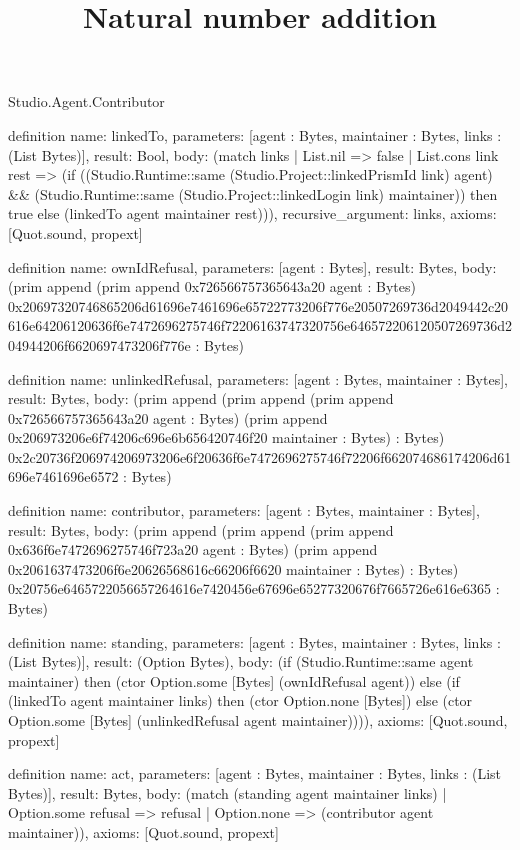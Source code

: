 \begin{lexlean}{Studio.Agent.Contributor}
\title{Natural number addition}
\begin{semanticmodule}
definition{
  name: linkedTo,
  parameters: [agent : Bytes, maintainer : Bytes, links : (List Bytes)],
  result: Bool,
  body: (match links
    | List.nil => false
    | List.cons link rest => (if ((Studio.Runtime::same (Studio.Project::linkedPrismId link) agent) && (Studio.Runtime::same (Studio.Project::linkedLogin link) maintainer)) then true else (linkedTo agent maintainer rest))),
  recursive_argument: links,
  axioms: [Quot.sound, propext]
}

definition{
  name: ownIdRefusal,
  parameters: [agent : Bytes],
  result: Bytes,
  body: (prim append (prim append 0x726566757365643a20 agent : Bytes) 0x20697320746865206d61696e7461696e65722773206f776e20507269736d2049442c20616e64206120636f6e7472696275746f72206163747320756e646572206120507269736d204944206f6620697473206f776e : Bytes)
}

definition{
  name: unlinkedRefusal,
  parameters: [agent : Bytes, maintainer : Bytes],
  result: Bytes,
  body: (prim append (prim append (prim append 0x726566757365643a20 agent : Bytes) (prim append 0x206973206e6f74206c696e6b656420746f20 maintainer : Bytes) : Bytes) 0x2c20736f206974206973206e6f20636f6e7472696275746f72206f662074686174206d61696e7461696e6572 : Bytes)
}

definition{
  name: contributor,
  parameters: [agent : Bytes, maintainer : Bytes],
  result: Bytes,
  body: (prim append (prim append (prim append 0x636f6e7472696275746f723a20 agent : Bytes) (prim append 0x2061637473206f6e20626568616c66206f6620 maintainer : Bytes) : Bytes) 0x20756e6465722056657264616e7420456e67696e65277320676f7665726e616e6365 : Bytes)
}

definition{
  name: standing,
  parameters: [agent : Bytes, maintainer : Bytes, links : (List Bytes)],
  result: (Option Bytes),
  body: (if (Studio.Runtime::same agent maintainer) then (ctor Option.some [Bytes] (ownIdRefusal agent)) else (if (linkedTo agent maintainer links) then (ctor Option.none [Bytes]) else (ctor Option.some [Bytes] (unlinkedRefusal agent maintainer)))),
  axioms: [Quot.sound, propext]
}

definition{
  name: act,
  parameters: [agent : Bytes, maintainer : Bytes, links : (List Bytes)],
  result: Bytes,
  body: (match (standing agent maintainer links)
    | Option.some refusal => refusal
    | Option.none => (contributor agent maintainer)),
  axioms: [Quot.sound, propext]
}


\end{semanticmodule}
\end{lexlean}
